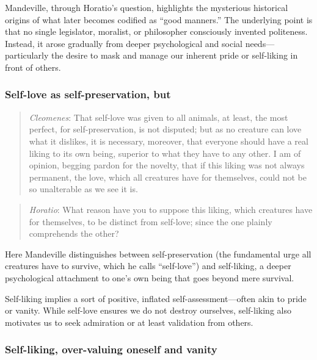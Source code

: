             Mandeville, through Horatio’s question, highlights the mysterious historical origins of what later becomes codified as “good manners.” The underlying point is that no single legislator, moralist, or philosopher consciously invented politeness. Instead, it arose gradually from deeper psychological and social needs—particularly the desire to mask and manage our inherent pride or self-liking in front of others.

        \subsubsection{Self-love as self-preservation, but}

            \begin{quote}
                \textit{Cleomenes}: That self-love was given to all animals, at least, the most perfect, for self-preservation, is not disputed; but as no creature can love what it dislikes, it is necessary, moreover, that everyone should have a real liking to its own being, superior to what they have to any other. I am of opinion, begging pardon for the novelty, that if this liking was not always permanent, the love, which all creatures have for themselves, could not be so unalterable as we see it is.
            \end{quote}

            \begin{quote}
                \textit{Horatio}: What reason have you to suppose this liking, which creatures have for themselves, to be distinct from self-love; since the one plainly comprehends the other?
            \end{quote}

            Here Mandeville distinguishes between self-preservation (the fundamental urge all creatures have to survive, which he calls “self-love”) and self-liking, a deeper psychological attachment to one’s own being that goes beyond mere survival.
            
            Self-liking implies a sort of positive, inflated self-assessment—often akin to pride or vanity. While self-love ensures we do not destroy ourselves, self-liking also motivates us to seek admiration or at least validation from others.

        \subsubsection{Self-liking, over-valuing oneself and vanity}

